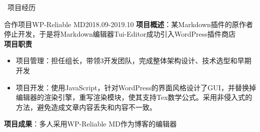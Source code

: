 \documentclass[UTF8]{resume}
\begin{document}
\begin{rSection}{\faUsers~项目经历}

    \begin{rProject}{合作项目}{WP-Reliable MD}{2018.09-2019.10}
        \textbf{项目概述}：某Markdown插件的原作者停止开发，于是将Markdown编辑器Tui-Editor成功引入WordPress插件商店\\
        \textbf{项目职责}
        \begin{itemize}
            \itemsep -0.5em \vspace{-0.5em}
            \item 项目管理：担任组长，带领3开发团队，完成整体架构设计、技术选型和早期开发
            \item 项目开发：使用JavaScript，针对WordPress的界面风格设计了GUI，并替换掉编辑器的渲染引擎，重写渲染模块，使其支持Tex数学公式。采用非侵入式的方法，避免造成文章内容丢失和内容不一致。
        \end{itemize}
        \textbf{项目成果}：多人采用WP-Reliable MD作为博客的编辑器
    \end{rProject}




\end{rSection}
\end{document}
